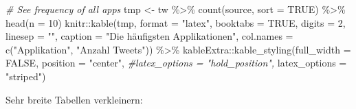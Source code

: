 \documentclass[
  11pt,
]{article}
\newenvironment{Shaded}{\begin{snugshade}}{\end{snugshade}}
\newcommand{\AttributeTok}[1]{\textcolor[rgb]{0.77,0.63,0.00}{#1}}
\newcommand{\CommentTok}[1]{\textcolor[rgb]{0.56,0.35,0.01}{\textit{#1}}}
\newcommand{\ConstantTok}[1]{\textcolor[rgb]{0.00,0.00,0.00}{#1}}
\newcommand{\DecValTok}[1]{\textcolor[rgb]{0.00,0.00,0.81}{#1}}
\newcommand{\FunctionTok}[1]{\textcolor[rgb]{0.00,0.00,0.00}{#1}}
\newcommand{\NormalTok}[1]{#1}
\newcommand{\OtherTok}[1]{\textcolor[rgb]{0.56,0.35,0.01}{#1}}
\newcommand{\SpecialCharTok}[1]{\textcolor[rgb]{0.00,0.00,0.00}{#1}}
\newcommand{\StringTok}[1]{\textcolor[rgb]{0.31,0.60,0.02}{#1}}
\begin{document}
\small

\linespread{1}

\begin{Shaded}
\begin{Highlighting}[]
\CommentTok{\# See frequency of all apps}
\NormalTok{tmp }\OtherTok{\textless{}{-}}\NormalTok{ tw }\SpecialCharTok{\%\textgreater{}\%} \FunctionTok{count}\NormalTok{(source, }\AttributeTok{sort =} \ConstantTok{TRUE}\NormalTok{) }\SpecialCharTok{\%\textgreater{}\%} 
  \FunctionTok{head}\NormalTok{(}\AttributeTok{n =} \DecValTok{10}\NormalTok{)}
\NormalTok{knitr}\SpecialCharTok{::}\FunctionTok{kable}\NormalTok{(tmp, }\AttributeTok{format =} \StringTok{"latex"}\NormalTok{, }\AttributeTok{booktabs =} \ConstantTok{TRUE}\NormalTok{, }\AttributeTok{digits =} \DecValTok{2}\NormalTok{, }\AttributeTok{linesep =} \StringTok{""}\NormalTok{,}
             \AttributeTok{caption =} \StringTok{"Die häufigsten Applikationen"}\NormalTok{,}
             \AttributeTok{col.names =} \FunctionTok{c}\NormalTok{(}\StringTok{"Applikation"}\NormalTok{, }\StringTok{"Anzahl Tweets"}\NormalTok{)) }\SpecialCharTok{\%\textgreater{}\%}
\NormalTok{  kableExtra}\SpecialCharTok{::}\FunctionTok{kable\_styling}\NormalTok{(}\AttributeTok{full\_width =} \ConstantTok{FALSE}\NormalTok{, }
                            \AttributeTok{position =} \StringTok{"center"}\NormalTok{,}
                            \CommentTok{\#latex\_options = "hold\_position",}
                            \AttributeTok{latex\_options =} \StringTok{"striped"}\NormalTok{)}
\end{Highlighting}
\end{Shaded}

\linespread{1.5}

\normalsize

Sehr breite Tabellen verkleinern:

\small

\linespread{1}
\end{document}
